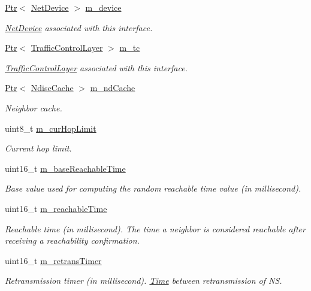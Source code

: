 \begin{DoxyCompactItemize}
\hyperlink{classns3_1_1Ptr}{Ptr}$<$ \hyperlink{classns3_1_1NetDevice}{Net\+Device} $>$ \hyperlink{classns3_1_1Ipv6Interface_a1330429d5db7b31fc0d5fe16609d8c61}{m\+\_\+device}
\begin{DoxyCompactList}\small\item\em \hyperlink{classns3_1_1NetDevice}{Net\+Device} associated with this interface. \end{DoxyCompactList}\item 
\hyperlink{classns3_1_1Ptr}{Ptr}$<$ \hyperlink{classns3_1_1TrafficControlLayer}{Traffic\+Control\+Layer} $>$ \hyperlink{classns3_1_1Ipv6Interface_ac47709de8ca8349e4275f9f074886729}{m\+\_\+tc}
\begin{DoxyCompactList}\small\item\em \hyperlink{classns3_1_1TrafficControlLayer}{Traffic\+Control\+Layer} associated with this interface. \end{DoxyCompactList}\item 
\hyperlink{classns3_1_1Ptr}{Ptr}$<$ \hyperlink{classns3_1_1NdiscCache}{Ndisc\+Cache} $>$ \hyperlink{classns3_1_1Ipv6Interface_a1bdc18fe1112305b92a32ed8d741624b}{m\+\_\+nd\+Cache}
\begin{DoxyCompactList}\small\item\em Neighbor cache. \end{DoxyCompactList}\item 
uint8\+\_\+t \hyperlink{classns3_1_1Ipv6Interface_a0b4e9c7395917c20bc89c21c577fa723}{m\+\_\+cur\+Hop\+Limit}
\begin{DoxyCompactList}\small\item\em Current hop limit. \end{DoxyCompactList}\item 
uint16\+\_\+t \hyperlink{classns3_1_1Ipv6Interface_ac417157a959058a8a3956bc1b0535701}{m\+\_\+base\+Reachable\+Time}
\begin{DoxyCompactList}\small\item\em Base value used for computing the random reachable time value (in millisecond). \end{DoxyCompactList}\item 
uint16\+\_\+t \hyperlink{classns3_1_1Ipv6Interface_a6a7a1c15533b9a58a66a9a5a8f611115}{m\+\_\+reachable\+Time}
\begin{DoxyCompactList}\small\item\em Reachable time (in millisecond). The time a neighbor is considered reachable after receiving a reachability confirmation. \end{DoxyCompactList}\item 
uint16\+\_\+t \hyperlink{classns3_1_1Ipv6Interface_aa114f456af3d6d0562b2a9f690a6af19}{m\+\_\+retrans\+Timer}
\begin{DoxyCompactList}\small\item\em Retransmission timer (in millisecond). \hyperlink{classns3_1_1Time}{Time} between retransmission of NS. \end{DoxyCompactList}\end{DoxyCompactItemize}
